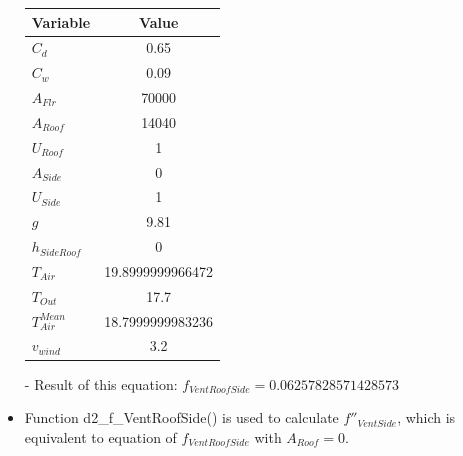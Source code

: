 \documentclass[a4paper]{article}
\numberwithin{equation}{section}
\begin{document}
\begin{itemize}
        \begin{table}[H]
          \centering
          \begin{tabular}{@{}lS[table-format=5.13]@{}}
            \toprule
            \textbf{Variable}  & \textbf{Value}   \\
            \midrule
            \(C_d\)            & 0.65             \\
            \(C_w\)            & 0.09             \\
            \(A_{Flr}\)        & 70000            \\
            \(A_{Roof}\)       & 14040            \\
            \(U_{Roof}\)       & 1                \\
            \(A_{Side}\)       & 0                \\
            \(U_{Side}\)       & 1                \\
            \(g\)              & 9.81             \\
            \(h_{SideRoof}\)   & 0                \\
            \(T_{Air}\)        & 19.8999999966472 \\
            \(T_{Out}\)        & 17.7             \\
            \(T_{Air}^{Mean}\) & 18.7999999983236 \\
            \(v_{wind}\)       & 3.2              \\
            \bottomrule
          \end{tabular}
        \end{table}

  \item[-] Result of this equation: \(f_{VentRoofSide} = 0.06257828571428573\)

  \item Function d2\_f\_VentRoofSide() is used to calculate \(f''_{VentSide}\), which is equivalent to equation of \(f_{VentRoofSide}\) with \(A_{Roof} = 0\).


\end{itemize}
\end{document}
